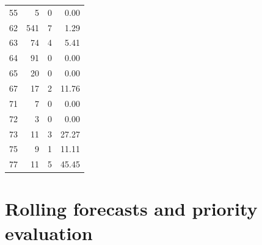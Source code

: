 \begin{small}
\begin{longtable}{rrrr}
55 & 5 & 0 & 0.00 \\

62 & 541 & 7 & 1.29 \\

63 & 74 & 4 & 5.41 \\

64 & 91 & 0 & 0.00 \\

65 & 20 & 0 & 0.00 \\

67 & 17 & 2 & 11.76 \\

71 & 7 & 0 & 0.00 \\

72 & 3 & 0 & 0.00 \\

73 & 11 & 3 & 27.27 \\

75 & 9 & 1 & 11.11 \\

77 & 11 & 5 & 45.45 \\

\bottomrule

\end{longtable}

\end{small}

\section{Rolling forecasts and priority evaluation}

